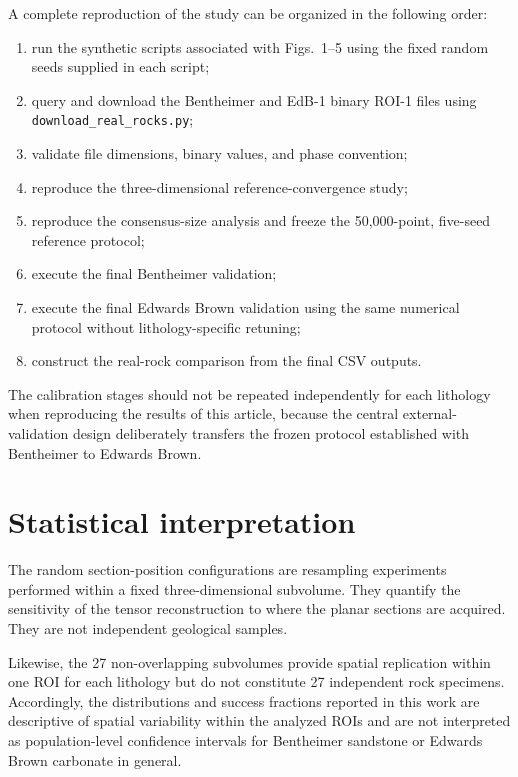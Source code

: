 \documentclass{article}
\begin{document}
A complete reproduction of the study can be organized in the following
order:

\begin{enumerate}
    \item run the synthetic scripts associated with Figs.~1--5 using the
          fixed random seeds supplied in each script;
    \item query and download the Bentheimer and EdB-1 binary ROI-1 files
          using \texttt{download\_real\_rocks.py};
    \item validate file dimensions, binary values, and phase convention;
    \item reproduce the three-dimensional reference-convergence study;
    \item reproduce the consensus-size analysis and freeze the
          50,000-point, five-seed reference protocol;
    \item execute the final Bentheimer validation;
    \item execute the final Edwards Brown validation using the same
          numerical protocol without lithology-specific retuning;
    \item construct the real-rock comparison from the final CSV outputs.
\end{enumerate}

The calibration stages should not be repeated independently for each
lithology when reproducing the results of this article, because the
central external-validation design deliberately transfers the frozen
protocol established with Bentheimer to Edwards Brown.

\section{Statistical interpretation}
\label{sec:SI_statistics}

The random section-position configurations are resampling experiments
performed within a fixed three-dimensional subvolume. They quantify the
sensitivity of the tensor reconstruction to where the planar sections
are acquired. They are not independent geological samples.

Likewise, the 27 non-overlapping subvolumes provide spatial replication
within one ROI for each lithology but do not constitute 27 independent
rock specimens. Accordingly, the distributions and success fractions
reported in this work are descriptive of spatial variability within the
analyzed ROIs and are not interpreted as population-level confidence
intervals for Bentheimer sandstone or Edwards Brown carbonate in
general.
\end{document}
